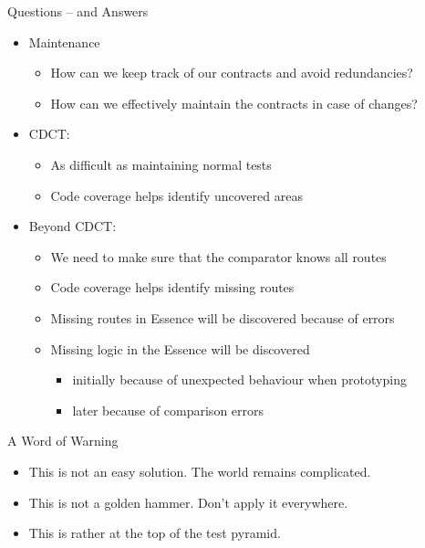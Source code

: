 \begin{frame}[fragile]{Questions -- and Answers}

\begin{itemize}
\item Maintenance
\begin{itemize}
\item How can we keep track of our contracts and avoid redundancies?
\item How can we effectively maintain the contracts in case of changes?
\end{itemize}
\end{itemize}

\onslide<+->
\begin{itemize}[<+->]
\item CDCT:
\begin{itemize}
\item As difficult as maintaining normal tests
\item Code coverage helps identify uncovered areas
\end{itemize}
\vspace{.4em}
\item Beyond CDCT:
\begin{itemize}
\item We need to make sure that the comparator knows all routes
\item Code coverage helps identify missing routes
\item Missing routes in Essence will be discovered because of errors
\item Missing logic in the Essence will be discovered
\begin{itemize}
\item initially because of unexpected behaviour when prototyping
\item later because of comparison errors
\end{itemize}
\end{itemize}
\end{itemize}

\end{frame}


\begin{frame}[fragile]{A Word of Warning}

\begin{itemize}[<+->]
\item This is not an easy solution. The world remains complicated.
\item This is not a golden hammer. Don't apply it everywhere.
\item This is rather at the top of the test pyramid.
\end{itemize}

\end{frame}


